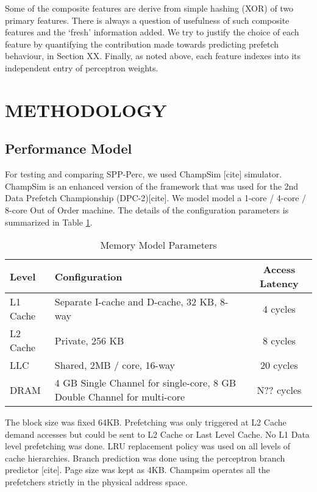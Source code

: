 \documentclass{sig-alternate}
\begin{document}
Some of the composite features are derive from simple hashing (XOR) of two primary features.
There is always a question of usefulness of such composite features and the `fresh' information added.
We try to justify the choice of each feature by quantifying the contribution made towards predicting prefetch behaviour, in Section XX.
Finally, as noted above, each feature indexes into its independent entry of perceptron weights.


\section{METHODOLOGY}
\subsection{Performance Model}
For testing and comparing SPP-Perc, we used ChampSim [cite] simulator. 
ChampSim is an enhanced version of the framework that was used for the 2nd Data Prefetch Championship (DPC-2)[cite]. 
We model model a 1-core / 4-core / 8-core Out of Order machine. The details of the configuration parameters is summarized in Table  \ref{tab:Sim_params}.

\begin{table}[]
    \centering
    \begin{tabular}{|l|p{3.6cm}|c|}
    \hline
    Level & Configuration & Access Latency \\
    \hline
         L1 Cache & Separate I-cache and D-cache, 32 KB, 8-way & 4 cycles\\
         L2 Cache & Private, 256 KB & 8 cycles\\
         LLC & Shared, 2MB / core, 16-way & 20 cycles\\
         DRAM & 4 GB Single Channel for single-core, 8 GB Double Channel for multi-core & N?? cycles\\
    \hline
    \end{tabular}
    \caption{Memory Model Parameters}
    \label{tab:Sim_params}
\end{table}

The block size was fixed 64KB. Prefetching was only triggered at L2 Cache demand accesses but could be sent to L2 Cache or Last Level Cache. 
No L1 Data level prefetching was done. 
LRU replacement policy was used on all levels of cache hierarchies. 
Branch prediction was done using the perceptron branch predictor [cite]. 
Page size was kept as 4KB. 
Champsim operates all the prefetchers strictly in the physical address space.
\end{document}

